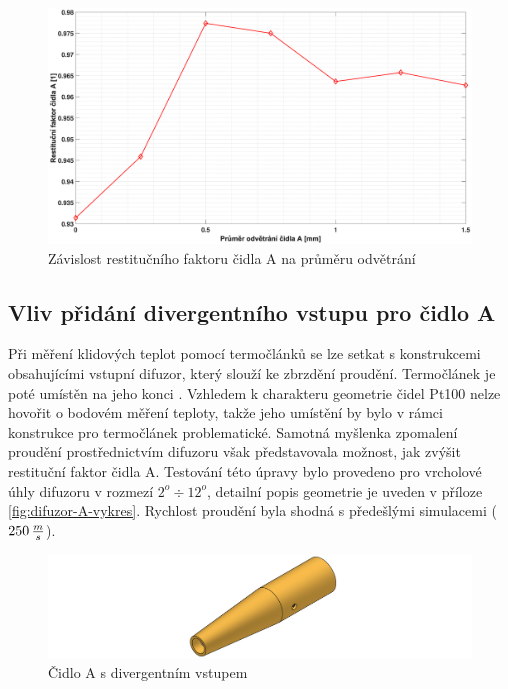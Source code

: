         \begin{figure}[ht!]
            \centering
            \includegraphics*[width=\textwidth, trim={5.25cm 1.0cm 5.8cm 2.0cm}]{400_SIMULACE_KONSTRUKCNICH_UPRAV/Grafy/07_prumer_odvetrani_A.eps}
            \caption{Závislost restitučního faktoru čidla A na průměru odvětrání}
            \label{fig:prumer-odvetrani-A}
        \end{figure}
    
    \newpage
    \subsection{Vliv přidání divergentního vstupu pro čidlo A}
        Při měření klidových teplot pomocí termočlánků se lze setkat s konstrukcemi obsahujícími vstupní difuzor, který slouží ke zbrzdění proudění. Termočlánek je poté umístěn na jeho konci \cite{Shapiro1954}. Vzhledem k charakteru geometrie čidel Pt100 nelze hovořit o bodovém měření teploty, takže jeho umístění by bylo v rámci konstrukce pro termočlánek problematické. Samotná myšlenka zpomalení proudění prostřednictvím difuzoru však představovala možnost, jak zvýšit restituční faktor čidla A. Testování této úpravy bylo provedeno pro vrcholové úhly difuzoru v rozmezí $2^o \div 12^o$, detailní popis geometrie je uveden v příloze \ref{fig:difuzor-A-vykres}. Rychlost proudění byla shodná s předešlými simulacemi ($250 \, \frac{m}{s}$).
        
        \begin{figure}[ht!]
            \centering
            \includegraphics[width=\textwidth]{400_SIMULACE_KONSTRUKCNICH_UPRAV/Vykresy_rendery/Difuzor_A.png}
            \caption{Čidlo A s divergentním vstupem}
            \label{fig:difuzor-A}
        \end{figure}

